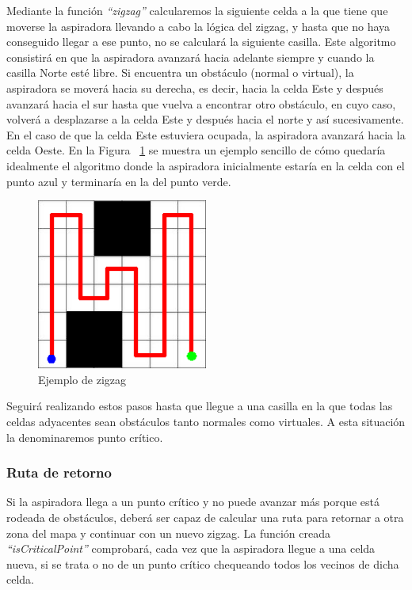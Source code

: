 Mediante la función \textit{``zigzag''} calcularemos la siguiente celda a la que tiene que moverse la aspiradora llevando a cabo la lógica del zigzag, y hasta que no haya conseguido llegar a ese punto, no se calculará la siguiente casilla. Este algoritmo consistirá en que la aspiradora avanzará hacia adelante siempre y cuando la casilla Norte esté libre. Si encuentra un obstáculo (normal o virtual), la aspiradora se moverá hacia su derecha, es decir, hacia la celda Este y después avanzará hacia el sur hasta que vuelva a encontrar otro obstáculo, en cuyo caso, volverá a desplazarse a la celda Este y después hacia el norte y así sucesivamente. En el caso de que la celda Este estuviera ocupada, la aspiradora avanzará hacia la celda Oeste. En la Figura ~\ref{fig.ejemplo} se muestra un ejemplo sencillo de cómo quedaría idealmente el algoritmo donde la aspiradora inicialmente estaría en la celda con el punto azul y terminaría en la del punto verde.

\begin{figure}[H]
  \begin{center}
    \includegraphics[width=0.5\textwidth]{figures/Vacuum/cuadriculaEj.png}
		\caption{Ejemplo de zigzag}
		\label{fig.ejemplo}
		\end{center}
\end{figure}

Seguirá realizando estos pasos hasta que llegue a una casilla en la que todas las celdas adyacentes sean obstáculos tanto normales como virtuales. A esta situación la denominaremos punto crítico.

\subsubsection{Ruta de retorno}
Si la aspiradora llega a un punto crítico y no puede avanzar más porque está rodeada de obstáculos, deberá ser capaz de calcular una ruta para retornar a otra zona del mapa y continuar con un nuevo zigzag. La función creada \textit{``isCriticalPoint''} comprobará, cada vez que la aspiradora llegue a una celda nueva, si se trata o no de un punto crítico chequeando todos los vecinos de dicha celda.\\

